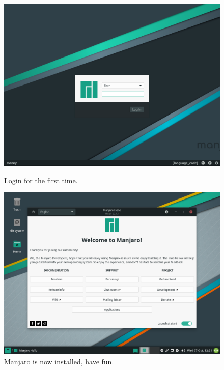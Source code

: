 \documentclass{article}
\begin{document}
\begin{figure}[ht!]
\begin{minipage}{0.5\textwidth}
        \includegraphics[width=.95\linewidth]{images/Login_for_the_first_time.png}
        \caption{Login for the first time.}
        \label{fig:loginPage}
    \end{minipage}\hfill
        \centering
    \begin{minipage}{0.5\textwidth}
        \includegraphics[width=.95\linewidth]{images/Now_you_have_linux_installed.png}
        \caption{Manjaro is now installed, have fun.}
        \label{fig:finalPage}
    \end{minipage}\hfill
    
\end{figure}
\end{document}
